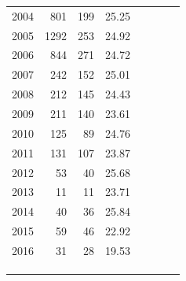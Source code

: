 \documentclass[12pt,]{article}
\begin{document}
\begin{table}[ht]
\begin{tabular}{rrrrllll}
  2004 & 801 & 199 & 25.25 &  &  &  &  \\ 
  2005 & 1292 & 253 & 24.92 &  &  &  &  \\ 
  2006 & 844 & 271 & 24.72 &  &  &  &  \\ 
  2007 & 242 & 152 & 25.01 &  &  &  &  \\ 
  2008 & 212 & 145 & 24.43 &  &  &  &  \\ 
  2009 & 211 & 140 & 23.61 &  &  &  &  \\ 
  2010 & 125 &  89 & 24.76 &  &  &  &  \\ 
  2011 & 131 & 107 & 23.87 &  &  &  &  \\ 
  2012 &  53 &  40 & 25.68 &  &  &  &  \\ 
  2013 &  11 &  11 & 23.71 &  &  &  &  \\ 
  2014 &  40 &  36 & 25.84 &  &  &  &  \\ 
  2015 &  59 &  46 & 22.92 &  &  &  &  \\ 
  2016 &  31 &  28 & 19.53 &  &  &  &  \\ 
   &  &  &  &  &  &  &  \\ 
   &  &  &  &  &  &  &  \\ 
   &  &  &  &  &  &  &  \\ 
   \hline
\end{tabular}
\end{table}

\FloatBarrier
\end{document}
